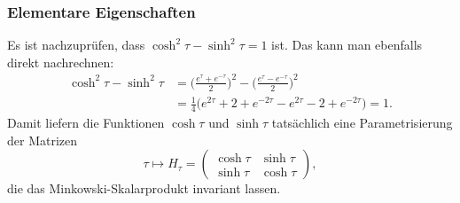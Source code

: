 \subsubsection{Elementare Eigenschaften}
Es ist nachzuprüfen, dass $\cosh^2 \tau-\sinh^2\tau=1$ ist.
Das kann man ebenfalls direkt nachrechnen:
\begin{align*}
\cosh^2\tau - \sinh^2\tau
&=
\biggl(
\frac{e^{\tau}+e^{-\tau}}2
\biggr)^2
-
\biggl(
\frac{e^{\tau}-e^{-\tau}}2
\biggr)^2
\\
&=
\frac14\bigl(
e^{2\tau}+2+e^{-2\tau}
-
e^{2\tau}-2+e^{-2\tau}
\bigr)
=1.
\end{align*}
Damit liefern die Funktionen $\cosh\tau$ und $\sinh\tau$
tatsächlich eine Parametrisierung der Matrizen
\[
\tau \mapsto H_{\tau}
=
\begin{pmatrix}
\cosh\tau & \sinh\tau \\
\sinh\tau & \cosh\tau 
\end{pmatrix},
\]
die das Minkowski-Skalarprodukt invariant lassen.


